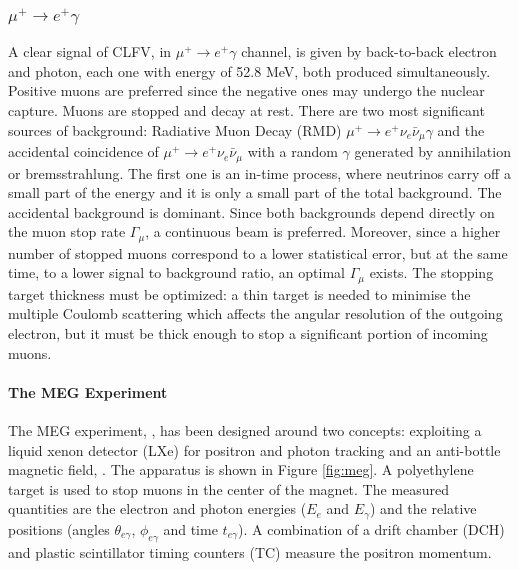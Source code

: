 \subsubsection{$\mu^+ \rightarrow e^+ \gamma$}
A clear signal of CLFV, in $\mu^+ \rightarrow e^+ \gamma$ channel, is given by back-to-back electron and photon, each one with energy of 52.8 MeV, 
both produced simultaneously. Positive muons are preferred since the negative ones may undergo the nuclear capture. 
Muons are stopped and decay at rest. There are two most significant sources of background: 
Radiative Muon Decay (RMD) $\mu^+ \rightarrow e^+ \nu_e \bar{\nu}_\mu \gamma$ 
and the accidental coincidence of $\mu^+ \rightarrow e^+ \nu_e \bar{\nu}_\mu$ with a random $\gamma$ 
generated by annihilation or bremsstrahlung. The first one is an in-time process, 
where neutrinos carry off a small part of the energy 
and it is only a small part of the total background. The accidental background 
is dominant. Since both backgrounds depend directly on the muon stop rate $\Gamma_\mu$,
a continuous beam is preferred.
Moreover, since a higher number of stopped muons correspond to a lower statistical error, but at the same time, to a lower signal to background ratio, an optimal $\Gamma_\mu$ exists.
The stopping target thickness must be optimized: a thin target is needed to minimise
the multiple Coulomb scattering which affects the angular resolution of the outgoing electron, but 
it must be thick enough to stop a significant portion of incoming muons. 
\paragraph{The MEG Experiment}
The MEG experiment, \cite{megi}, has been designed around two concepts: exploiting a liquid
xenon detector (LXe) for positron and photon tracking and an anti-bottle magnetic field, \cite{clfv_signorelli}. 
The apparatus is shown in Figure \ref{fig:meg}. A polyethylene target is used to stop muons in the center of the magnet. 
The measured quantities are the electron and photon energies ($E_e$ and $E_\gamma$) and the
relative positions (angles $\theta_{e\gamma}$, $\phi_{e\gamma}$ and time $t_{e \gamma}$).
A combination of a drift chamber (DCH) and plastic scintillator timing counters (TC) measure the positron momentum.


